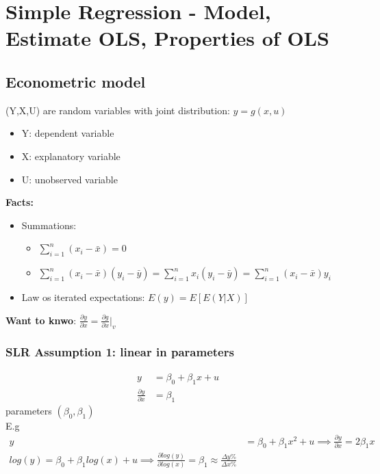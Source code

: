 \documentclass{article}
\theoremstyle{definition}
\theoremstyle{thrm}
\theoremstyle{lma}
\theoremstyle{ppst}
\theoremstyle{crlr}
\begin{document}
\section{Simple Regression - Model, Estimate OLS, Properties of OLS}
\subsection{Econometric model}
(Y,X,U) are random variables with joint distribution: $y = g(x,u)$
\begin{itemize}
	\item Y: dependent variable
	\item X: explanatory variable 
	\item U: unobserved variable
\end{itemize}
\textbf{Facts: }
\begin{itemize}
	\item Summations:
	\begin{itemize}
		\item $\sum_{i=1}^n(x_i-\bar{x}) = 0$
		\item $\sum_{i=1}^n(x_i-\bar{x})(y_i-\bar{y}) = \sum_{i=1}^nx_i(y_i-\bar{y}) = \sum_{i=1}^n(x_i-\bar{x})y_i$
	\end{itemize}
	\item Law os iterated expectations: $E(y) = E[E(Y|X)]$
\end{itemize}
\textbf{Want to knwo}: $\frac{\partial y}{\partial x} = \frac{\partial g}{\partial x}|_v$
\subsubsection{SLR Assumption 1: linear in parameters}
\begin{align*}
	y &= \beta_0 +\beta_1x+u\\
	\frac{\partial y}{\partial x} &= \beta_1
\end{align*}
parameters $(\beta_0,\beta_1)$\\
E.g
\begin{align*}
	y &=\beta_0+\beta_1x^2+u \implies \frac{\partial y}{\partial x} = 2\beta_1x\\
	log(y) = \beta_0+\beta_1log(x)+u\implies \frac{\partial log(y)}{\partial log(x)} = \beta_1 \approx \frac{\Delta y\%}{\Delta x\%}
\end{align*}
\end{document}
